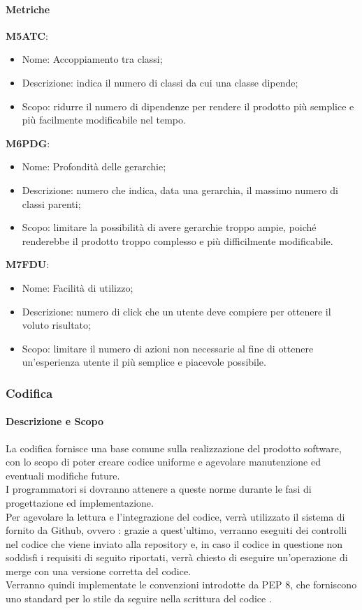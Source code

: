 \paragraph{Metriche} \hfill \break
\textbf{M5ATC}:
\begin{itemize}
  \item Nome: Accoppiamento tra classi;
  \item Descrizione: indica il numero di classi da cui una classe dipende;
  \item Scopo: ridurre il numero di dipendenze per rendere il prodotto più semplice e più facilmente modificabile nel tempo.
\end{itemize}
\textbf{M6PDG}:
\begin{itemize}
  \item Nome: Profondità delle gerarchie;
  \item Descrizione: numero che indica, data una gerarchia, il massimo numero di classi parenti;
  \item Scopo: limitare la possibilità di avere gerarchie troppo ampie, poiché renderebbe il prodotto troppo complesso e più difficilmente modificabile.
\end{itemize}
\textbf{M7FDU}:
\begin{itemize}
  \item Nome: Facilità di utilizzo;
  \item Descrizione: numero di click che un utente deve compiere per ottenere il voluto risultato;
  \item Scopo: limitare il numero di azioni non necessarie al fine di ottenere un'esperienza utente il più semplice e piacevole possibile.
\end{itemize}

\subsubsection{Codifica} 
    \paragraph{Descrizione e Scopo} \hfill \break
    La codifica fornisce una base comune sulla realizzazione del prodotto software, con lo scopo di poter creare codice uniforme e agevolare manutenzione ed eventuali modifiche future. \\
    I programmatori si dovranno attenere a queste norme durante le fasi di progettazione ed implementazione. \\
    Per agevolare la lettura e l'integrazione del codice, verrà utilizzato il sistema di  fornito da Github, ovvero : grazie a quest'ultimo, verranno
    eseguiti dei controlli nel codice che viene inviato alla repository e, in caso il codice in questione non soddisfi i requisiti di seguito riportati, verrà chiesto di eseguire un'operazione di merge con una versione corretta del codice. \\
    Verranno quindi implementate le convenzioni introdotte da PEP 8, che forniscono uno standard per lo stile da seguire nella scrittura del codice .

